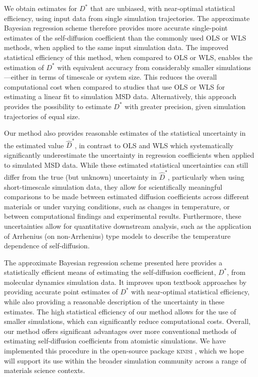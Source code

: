 \documentclass[reprint,superscriptaddress,nobibnotes,amsmath,amssymb,aps,prx,hidelinks,linenumbers]{revtex4-2}
\newcommand{\Dest}{\ensuremath{\widehat{D}^*}}
\newcommand{\D}{\ensuremath{D^*}}
\begin{document}
We obtain estimates for $\D$ that are unbiased, with near-optimal statistical efficiency, using input data from single simulation trajectories.
The approximate Bayesian regression scheme therefore provides more accurate single-point estimates of the self-diffusion coefficient than the commonly used OLS or WLS methods, when applied to the same input simulation data.
The improved statistical efficiency of this method, when compared to OLS or WLS, enables the estimation of $\D$ with equivalent accuracy from considerably smaller simulations---either in terms of timescale or system size. 
This reduces the overall computational cost when compared to studies that use OLS or WLS for estimating a linear fit to simulation MSD data.
Alternatively, this approach provides the possibility to estimate $\D$ with greater precision, given simulation trajectories of equal size.

Our method also provides reasonable estimates of the statistical uncertainty in the estimated value $\Dest$, in contrast to OLS and WLS which systematically significantly underestimate the uncertainty in regression coefficients when applied to simulated MSD data. 
While these estimated statistical uncertainties can still differ from the true (but unknown) uncertainty in $\Dest$, particularly when using short-timescale simulation data, they allow for scientifically meaningful comparisons to be made between estimated diffusion coefficients across different materials or under varying conditions, such as changes in temperature, or between computational findings and experimental results.
Furthermore, these uncertainties allow for quantitative downstream analysis, such as the application of Arrhenius (on non-Arrhenius) type models to describe the temperature dependence of self-diffusion.

The approximate Bayesian regression scheme presented here provides a statistically efficient means of estimating the self-diffusion coefficient, $\D$, from molecular dynamics simulation data.
It improves upon textbook approaches by providing accurate point estimates of $\D$ with near-optimal statistical efficiency, while also providing a reasonable description of the uncertainty in these estimates.
The high statistical efficiency of our method allows for the use of smaller simulations, which can significantly reduce computational costs.
Overall, our method offers significant advantages over more conventional methods of estimating self-diffusion coefficients from atomistic simulations.
We have implemented this procedure in the open-source package \textsc{kinisi} \cite{mccluskey_kinisi_2022}, which we hope will support its use within the broader simulation community across a range of materials science contexts.
\end{document}
